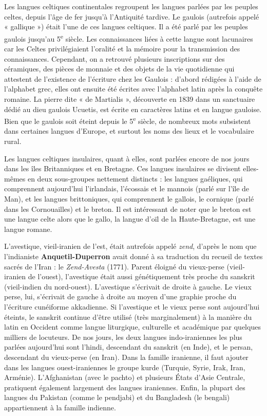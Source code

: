 Les langues celtiques continentales regroupent les langues parlées par les peuples celtes, depuis l’âge de fer jusqu’à l’Antiquité tardive. Le gaulois (autrefois appelé « gallique ») était l’une de ces langues celtiques. Il a été parlé par les peuples gaulois jusqu’au 5\textsuperscript{e} siècle. Les connaissances liées à cette langue sont lacunaires car les Celtes privilégiaient l’oralité et la mémoire pour la transmission des connaissances. Cependant, on a retrouvé plusieurs inscriptions sur des céramiques, des pièces de monnaie et des objets de la vie quotidienne qui attestent de l’existence de l’écriture chez les Gaulois : d’abord rédigées à l’aide de l’alphabet grec, elles ont ensuite été écrites avec l’alphabet latin après la conquête romaine. La pierre dite « de Martialis », découverte en 1839 dans un sanctuaire dédié au dieu gaulois Ucuetis, est écrite en caractères latins et en langue gauloise. Bien que le gaulois soit éteint depuis le 5\textsuperscript{e} siècle, de nombreux mots subsistent dans certaines langues d’Europe, et surtout les noms des lieux et le vocabulaire rural.

Les langues celtiques insulaires, quant à elles, sont parlées encore de nos jours dans les îles Britanniques et en Bretagne. Ces langues insulaires se divisent elles-mêmes en deux sous-groupes nettement distincts : les langues gaéliques, qui comprennent aujourd’hui l’irlandais, l’écossais et le mannois (parlé sur l’île de Man), et les langues brittoniques, qui comprennent le gallois, le cornique (parlé dans les Cornouailles) et le breton. Il est intéressant de noter que le breton est une langue celte alors que le gallo, la langue d’oïl de la Haute-Bretagne, est une langue romane.

L’avestique, vieil-iranien de l’est, était autrefois appelé \textit{zend}, d’après le nom que l’indianiste \textbf{Anquetil-Duperron} avait donné à sa traduction du recueil de textes sacrés de l’Iran : le \textit{Zend-Avesta} (1771). Parent éloigné du vieux-perse (vieil-iranien de l’ouest), l’avestique était aussi génétiquement très proche du sanskrit (vieil-indien du nord-ouest). L’avestique s’écrivait de droite à gauche. Le vieux perse, lui, s’écrivait de gauche à droite au moyen d’une graphie proche du l’écriture cunéiforme akkadienne. Si l’avestique et le vieux perse sont aujourd’hui éteints, le sanskrit continue d’être utilisé (très marginalement) à la manière du latin en Occident comme langue liturgique, culturelle et académique par quelques milliers de locuteurs. De nos jours, les deux langues indo-iraniennes les plus parlées aujourd’hui sont l’hindi, descendant du sanskrit (en Inde), et le persan, descendant du vieux-perse (en Iran). Dans la famille iranienne, il faut ajouter dans les langues ouest-iraniennes le groupe kurde (Turquie, Syrie, Irak, Iran, Arménie). L’Afghanistan (avec le pachto) et plusieurs États d’Asie Centrale, pratiquent également largement des langues iraniennes. Enfin, la plupart des langues du Pakistan (comme le pendjabi) et du
Bangladesh (le bengali) appartiennent à la famille indienne.

